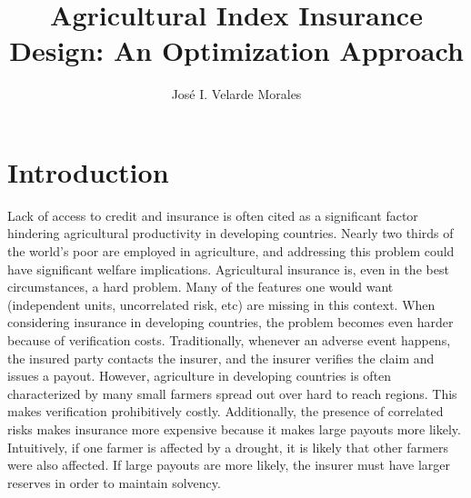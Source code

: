 \documentclass[11pt]{article}
\title{Agricultural Index Insurance Design: An Optimization Approach}
\author{José I. Velarde Morales}
\begin{document}
\maketitle

\section{Introduction}
Lack of access to credit and insurance is often cited as a significant factor hindering agricultural productivity in developing countries. Nearly two thirds of the world's poor are employed in agriculture, and addressing this problem could have significant welfare implications. Agricultural insurance is, even in the best circumstances, a hard problem. Many of the features one would want (independent units, uncorrelated risk, etc) are missing in this context. When considering insurance in developing countries, the problem becomes even harder because of verification costs. Traditionally, whenever an adverse event happens, the insured party contacts the insurer, and the insurer verifies the claim and issues a payout. However, agriculture in developing countries is often characterized by many small farmers spread out over hard to reach regions. This makes verification prohibitively costly. Additionally, the presence of correlated risks makes insurance more expensive because it makes large payouts more likely. Intuitively, if one farmer is affected by a drought, it is likely that other farmers were also affected. If large payouts are more likely, the insurer must have larger reserves in order to maintain solvency. 
\end{document}
